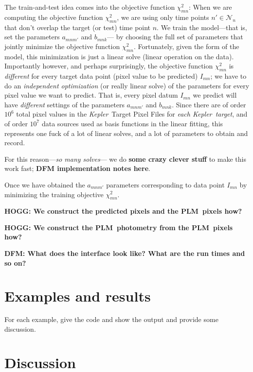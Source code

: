 \documentclass[12pt, preprint]{aastex}
\newcommand{\project}[1]{\textsl{#1}}
\newcommand{\Kepler}{\project{Kepler}}
\newcommand{\name}{PLM}
\newcommand{\set}[1]{\mathcal{#1}}
\newcommand{\todo}[1]{\textbf{#1}}
\begin{document}
The train-and-test idea comes into the objective function $\chi^2_{mn}$:
When we are computing the objective function $\chi^2_{mn}$,
  we are using only time points $n'\in\set{N}_n$ that don't overlap the target (or test) time point $n$.
We train the model---that is, set the parameters $a_{mnm'}$ and $b_{mnk}$---%
  by choosing the full set of parameters that jointly minimize the objective function $\chi^2_{mn}$.
Fortunately, given the form of the model,
  this minimization is just a linear solve (linear operation on the data).
Importantly however, and perhaps surprisingly, the objective function $\chi^2_{mn}$ is \emph{different}
  for every target data point (pixel value to be predicted) $I_{mn}$;
  we have to do an \emph{independent optimization} (or really linear solve)
  of the parameters for every pixel value we want to predict.
That is, every pixel datum $I_{mn}$ we predict will have
  \emph{different} settings of the parameters $a_{mnm'}$ and $b_{mnk}$.
Since there are of order $10^{6}$ total pixel values in the \Kepler\ Target Pixel Files for \emph{each \Kepler\ target},
  and of order $10^7$ data sources used as basis functions in the linear fitting,
  this represents one fuck of a lot of linear solves,
  and a lot of parameters to obtain and record.

For this reason---\emph{so many solves}---%
  we do \todo{some crazy clever stuff} to make this work fast;
  \todo{DFM implementation notes here}.

Once we have obtained the $a_{mnm'}$ parameters corresponding to data point $I_{mn}$ by minimizing the training objective $\chi^2_{mn}$.

\todo{HOGG: We construct the predicted pixels and the \name\ pixels how?}

\todo{HOGG: We construct the \name\ photometry from the \name\ pixels how?}

\todo{DFM: What does the interface look like?  What are the run times and so on?}

\section{Examples and results}

For each example, give the code and show the output and provide some discussion.

\section{Discussion}
\end{document}
